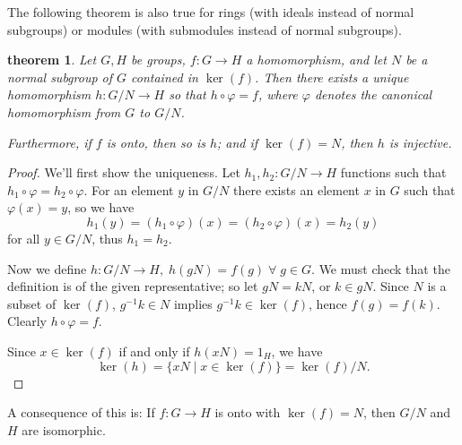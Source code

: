 \documentclass[12pt]{article}
\newtheorem{theorem}{theorem}
\begin{document}
The following theorem is also true for rings (with ideals instead of normal subgroups) or modules (with submodules instead of normal subgroups).
\begin{theorem}
Let $G,H$ be groups, $f\colon G \to H$ a homomorphism, and let $N$ be a normal subgroup of $G$ contained in $\ker(f)$. Then there exists a unique homomorphism $h\colon G/N \to H$ so that $h \circ \varphi=f$, where $\varphi$ denotes the canonical homomorphism from $G$ to $G/N$.

Furthermore, if $f$ is onto, then so is $h$; and if $\ker(f)=N$, then $h$ is injective.
\end{theorem}
\begin{proof}
We'll first show the uniqueness. Let $h_1, h_2\colon G/N \to H$ functions such that $h_1 \circ \varphi=h_2 \circ \varphi$. For an element $y$ in $G/N$ there exists an element $x$ in $G$ such that $\varphi(x)=y$, so we have
\[h_1(y)=(h_1 \circ \varphi)(x)=(h_2 \circ \varphi)(x)=h_2(y)\]
for all $y \in G/N$, thus $h_1=h_2$.

Now we define $h: G/N \to H,\; h(gN)=f(g)\;\forall\;g \in G$. We must check that the definition is  of the given representative; so let $gN=kN$, or $k \in gN$. Since $N$ is a subset of $\ker(f)$, $g^{-1}k \in N$ implies $g^{-1}k \in \ker(f)$, hence $f(g)=f(k)$. Clearly $h \circ \varphi=f$.

Since $x \in \ker(f)$ if and only if $h(xN)=1_H$, we have
\[\ker(h)=\{xN \mid x \in \ker(f)\}=\ker(f)/N.\]
\end{proof}
A consequence of this is: If $f\colon G \to H$ is onto with $\ker(f)=N$, then $G/N$ and $H$ are isomorphic.
\end{document}
